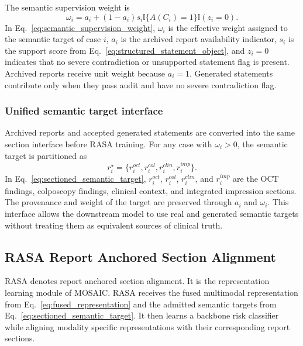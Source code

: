 The semantic supervision weight is
\begin{equation}
\omega_i
=
a_i+(1-a_i)s_i\mathbb{I}\{A(C_i)=1\}\mathbb{I}(z_i=0).
\label{eq:semantic_supervision_weight}
\end{equation}
In Eq.~\eqref{eq:semantic_supervision_weight}, $\omega_i$ is the effective weight assigned to the semantic target of case $i$, $a_i$ is the archived report availability indicator, $s_i$ is the support score from Eq.~\eqref{eq:structured_statement_object}, and $z_i=0$ indicates that no severe contradiction or unsupported statement flag is present. Archived reports receive unit weight because $a_i=1$. Generated statements contribute only when they pass audit and have no severe contradiction flag.

\subsubsection{Unified semantic target interface}
\label{subsubsec:semantic_target_interface}

Archived reports and accepted generated statements are converted into the same section interface before RASA training. For any case with $\omega_i>0$, the semantic target is partitioned as
\begin{equation}
r_i^{\star}=\{r_i^{oct},r_i^{col},r_i^{clin},r_i^{imp}\}.
\label{eq:sectioned_semantic_target}
\end{equation}
In Eq.~\eqref{eq:sectioned_semantic_target}, $r_i^{oct}$, $r_i^{col}$, $r_i^{clin}$, and $r_i^{imp}$ are the OCT findings, colposcopy findings, clinical context, and integrated impression sections. The provenance and weight of the target are preserved through $a_i$ and $\omega_i$. This interface allows the downstream model to use real and generated semantic targets without treating them as equivalent sources of clinical truth.

\subsection{RASA Report Anchored Section Alignment}
\label{subsec:rasa_section_alignment}

RASA denotes report anchored section alignment. It is the representation learning module of MOSAIC. RASA receives the fused multimodal representation from Eq.~\eqref{eq:fused_representation} and the admitted semantic targets from Eq.~\eqref{eq:sectioned_semantic_target}. It then learns a backbone risk classifier while aligning modality specific representations with their corresponding report sections.


